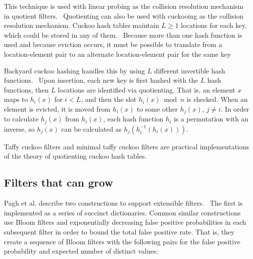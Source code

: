 \documentclass[sigconf]{acmart}
\newcommand{\etal}{et al.}
\begin{document}
This technique is used with linear probing as the collision resolution mechanism in quotient filters.~\cite{quotient-filter}
Quotienting can also be used with cuckooing as the collision resolution mechanism.
Cuckoo hash tables maintain $L \ge 1$ locations for each key, which could be stored in any of them.~\cite{cuckoo-journal}
Because more than one hash function is used and because eviction occurs, it must be possible to translate from a location-element pair to an alternate location-element pair for the same key



Backyard cuckoo hashing handles this by using $L$ different invertible hash functions.~\cite{backyard}
Upon insertion, each new key is first hashed with the $L$ hash functions, then $L$ locations are identified via quotienting.
That is, an element $x$ maps to $h_i(x)$ for $i < L$, and then the slot $h_i(x) \bmod n$ is checked.
When an element is evicted, it is moved from $h_i(x)$ to some other $h_j(x)$, $j \ne i$.
In order to calculate $h_j(x)$ from $h_i(x)$, each hash function $h_i$ is a permutation with an inverse, so $h_j(x)$ can be calculated as $h_j(h_i^{-1}(h_i(x)))$.

Taffy cuckoo filters and minimal taffy cuckoo filters are practical implementations of the theory of quotienting cuckoo hash tables.


\subsection{Filters that can grow}

Pagh \etal{} describe two constructions to support extensible filters.~\cite{psw}
The first is implemented as a series of succinct dictionaries.
Common similar constructions use Bloom filters and exponentially decreasing false positive probabilities in each subsequent filter in order to bound the total false positive rate.
That is, they create a sequence of Bloom filters with the following pairs for the false positive probability and expected number of distinct values:
\end{document}

